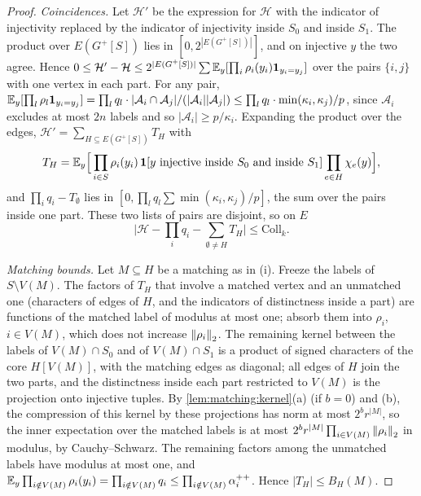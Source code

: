 \begin{proof}
\emph{Coincidences.} Let $\mathcal H'$ be the expression for $\mathcal H$ with the indicator of
injectivity replaced by the indicator of injectivity inside $S_0$ and inside $S_1$.
The product over $E(G^+[S])$ lies in $[0,2^{|E(G^+[S])|}]$, and on injective $y$ the
two agree. Hence
$0\le\mathcal H'-\mathcal H\le2^{|E(G^+[S])|}\sum\mathbb E_y[\prod_i\rho_i(y_i)\mathbf 1_{y_i=y_j}]$ over the
pairs $\{i,j\}$ with one vertex in each part. For any pair,
$\mathbb E_y[\prod_l\rho_l\mathbf 1_{y_i=y_j}]=\prod_lq_l\cdot|\mathcal A_i\cap\mathcal A_j|/(|\mathcal A_i||\mathcal A_j|)
\le\prod_lq_l\cdot\min(\kappa_i,\kappa_j)/p$, since $\mathcal A_i$ excludes at most $2n$ labels
and so $|\mathcal A_i|\ge p/\kappa_i$. Expanding the product over the edges,
$\mathcal H'=\sum_{H\subseteq E(G^+[S])}T_H$ with
\[
  T_H=\E_y\Big[\prod_{i\in S}\rho_i(y_i)\,\one[y\ \text{injective inside}\ S_0\ \text{and inside}\ S_1]
  \prod_{e\in H}\chi_e(y)\Big],
\]
and $\prod_iq_i-T_\emptyset$ lies in $[0,\prod_lq_l\sum\min(\kappa_i,\kappa_j)/p]$, the sum over
the pairs inside one part. These two lists of pairs are disjoint, so on $E$
\[
  \Big|\mathcal H-\prod_iq_i-\sum_{\emptyset\ne H}T_H\Big|\le\mathrm{Coll}_k .
\]

\emph{Matching bounds.} Let $M\subseteq H$ be a matching as in (i). Freeze the labels of
$S\setminus V(M)$. The factors of $T_H$ that involve a matched vertex and an unmatched
one (characters of edges of $H$, and the indicators of distinctness inside a part)
are functions of the matched label of modulus at most one; absorb them into
$\rho_i$, $i\in V(M)$, which does not increase $\left\|\rho_i\right\|_2$. The remaining
kernel between the labels of $V(M)\cap S_0$ and of $V(M)\cap S_1$ is a product of
signed characters of the core $H[V(M)]$, with the matching edges as diagonal; all
edges of $H$ join the two parts, and the distinctness inside each part restricted
to $V(M)$ is the projection onto injective tuples. By \cref{lem:matching:kernel}(a)
(if $b=0$) and (b), the compression of this kernel by these projections has norm at
most $2^br^{|M|}$, so the inner
expectation over the matched labels is at most
$2^br^{|M|}\prod_{i\in V(M)}\left\|\rho_i\right\|_2$ in modulus, by Cauchy--Schwarz. The
remaining factors among the unmatched labels have modulus at most one, and
$\mathbb E_y\prod_{i\notin V(M)}\rho_i(y_i)=\prod_{i\notin V(M)}q_i\le\prod_{i\notin V(M)}\alpha^{++}_i$.
Hence $|T_H|\le B_H(M)$.


\end{proof}
